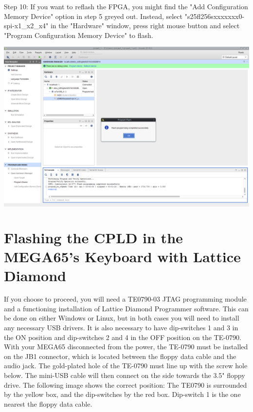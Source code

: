 \begin{minipage}{\linewidth}
Step 10: If you want to reflash the FPGA, you might find the
"Add Configuration Memory Device" option in step 5 greyed out.
Instead, select "s25fl256sxxxxxxx0-spi-x1\_x2\_x4"  in the "Hardware"
window, press right mouse button and select "Program Configuration
Memory Device" to flash.
  \\
  \begin{center}
    \includegraphics[width=0.8\linewidth]{images/vivado09.png}
  \end{center}
\end{minipage}


\section{Flashing the CPLD in the MEGA65's Keyboard with Lattice Diamond}


If you choose to proceed, you will need a TE0790-03 JTAG programming
module and a functioning installation of Lattice Diamond Programmer software.
This can be done on either Windows or Linux, but in both cases you will
need to install any necessary USB drivers. It is also necessary to have
dip-switches 1 and 3 in the ON position and dip-switches 2 and 4 in the
OFF position on the TE-0790. With your MEGA65 disconnected from the power,
the TE-0790 must be installed on the JB1 connector, which is located
between the floppy data cable and the audio jack.
The gold-plated hole of the TE-0790 must line up with the screw hole below.
The mini-USB cable will then connect on the side towards the 3.5" floppy drive.
The following image shows the correct position: The TE0790 is surrounded
by the yellow box, and the dip-switches by the red box. Dip-switch 1 is
the one nearest the floppy data cable.



